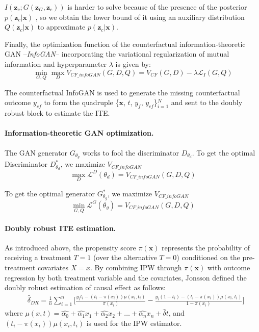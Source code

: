 \documentclass{amia}
\begin{document}
$I(\textbf{z}_c; G(\textbf{z}_G, \textbf{z}_c))$ is harder to solve because of the presence of the posterior $p(\textbf{z}_c|\textbf{x})$ \cite{chen2016infogan}, so we obtain the lower bound of it using an auxiliary distribution $Q(\textbf{z}_c|\textbf{x})$ to approximate $p(\textbf{z}_c|\textbf{x})$. 

Finally, the optimization function of the counterfactual information-theoretic GAN --\emph{InfoGAN}-- incorporating the variational regularization of mutual information and hyperparameter $\lambda$ is given by:
\begin{equation}
    \min_{G, Q} \max_{D} V_{CF\_infoGAN}(G, D, Q) = V_{CF}(G, D) - \lambda \mathcal{L}_I(G, Q)
    \label{equ: Info_GAN}
\end{equation}

The counterfactual InfoGAN is used to generate the missing counterfactual outcome $y_{cf}$ to form the quadruple \{$\textbf{x}$, $t$, $y_f$, $y_{cf}$\}$_{i=1}^N$ and sent to the doubly robust block to estimate the ITE.

\paragraph*{Information-theoretic GAN optimization.}
The GAN generator $G_{\theta_g}$ works to fool the discriminator $D_{\theta_d}$. To get the optimal Discriminator $D_{\theta_d}^*$, we maximize $V_{CF\_infoGAN}$
\begin{equation}
    \max_D \mathcal{L}^D(\theta_d) =  V_{CF\_infoGAN}(G, D, Q)
    \label{equ: Info_GAN_D}
\end{equation}

To get the optimal generator $G_{\theta_g}^*$, we maximize $V_{CF\_infoGAN}$
\begin{equation}
    \min_{G, Q} \mathcal{L}^G(\theta_g) =  V_{CF\_infoGAN}(G, D, Q)
    \label{equ: Info_GAN_G}
\end{equation}

\paragraph*{Doubly robust ITE estimation.}

As introduced above, the propensity score $\pi(\textbf{x})$ represents the probability of receiving a treatment $T=1$ (over the alternative $T=0$) conditioned on the pre-treatment covariates $X = x$. By combining IPW through $\pi(\textbf{x})$ with outcome regression by both treatment variable and the covariates, Jonsson defined the doubly robust estimation of causal effect \cite{funk2011doubly} as follows:
\begin{align}
    &\hat{\delta}_{DR} = \frac{1}{n}\sum_{i=1}^n\bigg[\frac{y_it_i - (t_i - \pi(x_i))\mu(x_i, t_i)}{\pi(x_i)} -\frac{y_i(1 - t_i) - (t_i - \pi(x_i))\mu(x_i, t_i)}{1-\pi(x_i)}\bigg] 
\end{align}
where $\mu(x, t) = \hat{\alpha_0} + \hat{\alpha_1}x_1 + \hat{\alpha_2}x_2 + \dots + \hat{\alpha_n}x_n + \hat{\delta}t$, and 
    $(t_i - \pi(x_i))\mu(x_i, t_i)$ is used for the IPW estimator.
\end{document}
